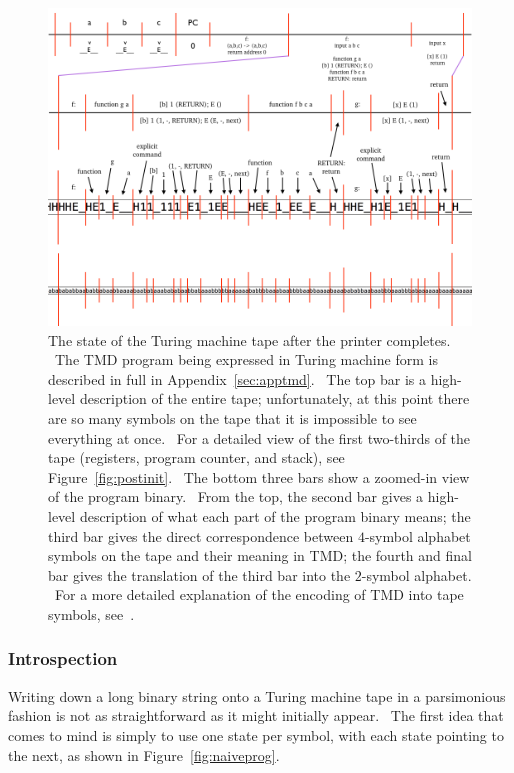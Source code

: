 \documentclass[11pt]{article}
\begin{document}
\begin{figure}
\begin{center}
\includegraphics[scale=0.42]{figs/postprog.png}
\caption{The state of the Turing machine tape after the printer completes. \ The TMD program being expressed in Turing machine form is described in full in Appendix~\ref{sec:apptmd}. \ The top bar is a high-level description of the entire tape; unfortunately, at this point there are so many symbols on the tape that it is impossible to see everything at once. \ For a detailed view of the first two-thirds of the tape (registers, program counter, and stack), see Figure~\ref{fig:postinit}. \ The bottom three bars show a zoomed-in view of the program binary. \ From the top, the second bar gives a high-level description of what each part of the program binary means; the third bar gives the direct correspondence between $4$-symbol alphabet symbols on the tape and their meaning in TMD; the fourth and final bar gives the translation of the third bar into the $2$-symbol alphabet. \ For a more detailed explanation of the encoding of TMD into tape symbols, see~\cite{github}. \label{fig:postprog}}
\end{center}
\end{figure}

\subsubsection{Introspection}

Writing down a long binary string onto a Turing machine tape in a parsimonious fashion is not as straightforward as it might initially appear. \ The first idea that comes to mind is simply to use one state per symbol, with each state pointing to the next, as shown in Figure~\ref{fig:naiveprog}.
\end{document}
